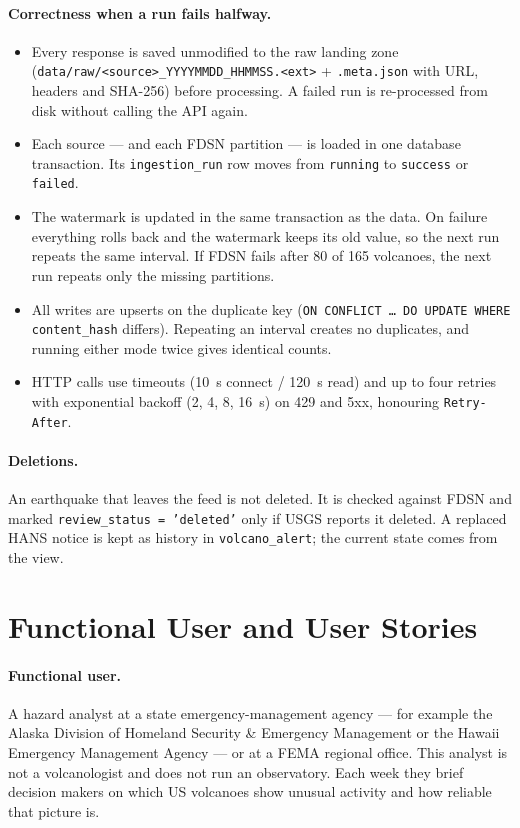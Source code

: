 \documentclass[11pt,a4paper]{article}
\begin{document}
\paragraph{Correctness when a run fails halfway.}
\begin{itemize}
  \item Every response is saved unmodified to the raw landing zone
  (\texttt{data/raw/<source>\_YYYYMMDD\_HHMMSS.<ext>} + \texttt{.meta.json} with URL,
  headers and SHA-256) before processing. A failed run is re-processed from disk
  without calling the API again.
  \item Each source --- and each FDSN partition --- is loaded in one database
  transaction. Its \texttt{ingestion\_run} row moves from \texttt{running} to
  \texttt{success} or \texttt{failed}.
  \item The watermark is updated in the same transaction as the data. On failure
  everything rolls back and the watermark keeps its old value, so the next run repeats
  the same interval. If FDSN fails after 80 of 165 volcanoes, the next run repeats only
  the missing partitions.
  \item All writes are upserts on the duplicate key
  (\texttt{ON CONFLICT \dots{} DO UPDATE WHERE content\_hash} differs). Repeating an
  interval creates no duplicates, and running either mode twice gives identical counts.
  \item HTTP calls use timeouts (10~s connect / 120~s read) and up to four retries with
  exponential backoff (2, 4, 8, 16~s) on 429 and 5xx, honouring \texttt{Retry-After}.
\end{itemize}

\paragraph{Deletions.}
An earthquake that leaves the feed is not deleted. It is checked against FDSN and
marked \texttt{review\_status = 'deleted'} only if USGS reports it deleted. A replaced
HANS notice is kept as history in \texttt{volcano\_alert}; the current state comes from
the view.

\section{Functional User and User Stories}
\label{sec:user}

\paragraph{Functional user.}
A hazard analyst at a state emergency-management agency --- for example the Alaska
Division of Homeland Security \& Emergency Management or the Hawaii Emergency
Management Agency --- or at a FEMA regional office. This analyst is not a
volcanologist and does not run an observatory. Each week they brief decision makers on
which US volcanoes show unusual activity and how reliable that picture is.
\end{document}
